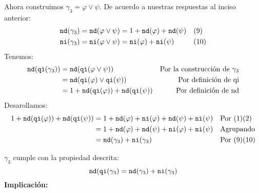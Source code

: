 \documentclass[8pt, letterpaper]{article}
\begin{document}
\begin{enumerate}
   Ahora construimos $\gamma_3 = \varphi \lor \psi$. De acuerdo a nuestras
   respuestas al inciso anterior:
   \begin{align*}
     {\tt nd}(\gamma_3) &= {\tt nd}(\varphi\lor\psi) = 1 +
     {\tt nd}(\varphi) + {\tt nd}(\psi)& &(9) \\
     {\tt ni}(\gamma_3) &= {\tt ni}(\varphi\lor\psi) =
     {\tt ni}(\varphi) + {\tt ni}(\psi)& &(10)
   \end{align*}
   Tenemos:
   \begin{align*}
     {\tt nd}({\tt qi}(\gamma_3)) &= {\tt nd}({\tt qi}(\varphi\lor
     \psi))& \text{Por la construcción de } \gamma_3 \\
     &= {\tt nd}({\tt qi}(\varphi)\lor{\tt qi}(\psi)) & \text{
       Por definición de qi} \\
     &= 1 + {\tt nd}({\tt qi}(\varphi)) + {\tt nd}({\tt qi}(\psi)) &
       \text{ Por definición de nd} \\
   \end{align*}
   Desarollamos:
   \begin{align*}
     1 + {\tt nd}({\tt qi}(\varphi)) + {\tt nd}({\tt qi}(\psi)) &= 1 +
     {\tt nd}(\varphi) + {\tt ni}(\varphi)+{\tt nd}(\psi) + {\tt ni}(\psi)
     & &\text{Por } (1)(2)\\
     &= 1+ {\tt nd}(\varphi) + {\tt nd}(\psi) + {\tt ni}(\varphi) +
     {\tt ni}(\psi) & &\text{Agrupando}\\
     &=  {\tt nd}(\gamma_3) + {\tt ni}(\gamma_3)& &\text{Por } (9)(10)
     \end{align*}

   $\gamma_3$ cumple con la propiedad descrita:
   $${\tt nd}({\tt qi}(\gamma_3) = {\tt nd}(\gamma_3) + {\tt ni}(\gamma_3)$$
   \hfill\break
   {\bf Implicación:}
   

\end{enumerate}
\end{document}
